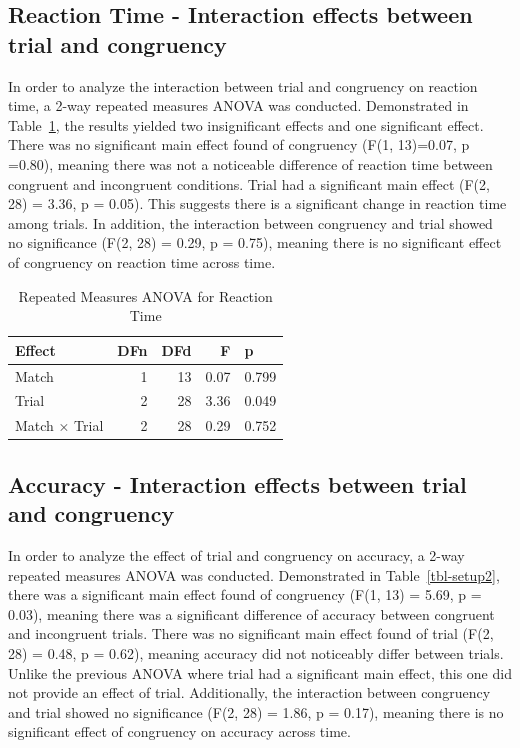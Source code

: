 \documentclass[
  authoryear,
  preprint]{elsarticle}
\begin{document}
\subsection{Reaction Time - Interaction effects between trial and
congruency}\label{reaction-time---interaction-effects-between-trial-and-congruency}

In order to analyze the interaction between trial and congruency on
reaction time, a 2-way repeated measures ANOVA was conducted.
Demonstrated in Table~\ref{tbl-setup1}, the results yielded two
insignificant effects and one significant effect. There was no
significant main effect found of congruency (F(1, 13)=0.07, p =0.80),
meaning there was not a noticeable difference of reaction time between
congruent and incongruent conditions. Trial had a significant main
effect (F(2, 28) = 3.36, p = 0.05). This suggests there is a significant
change in reaction time among trials. In addition, the interaction
between congruency and trial showed no significance (F(2, 28) = 0.29, p
= 0.75), meaning there is no significant effect of congruency on
reaction time across time.

\begin{longtable}[]{@{}lrrrl@{}}

\caption{\label{tbl-setup1}Repeated Measures ANOVA for Reaction Time}

\tabularnewline

\toprule\noalign{}
Effect & DFn & DFd & F & p \\
\midrule\noalign{}
\endhead
\bottomrule\noalign{}
\endlastfoot
Match & 1 & 13 & 0.07 & 0.799 \\
Trial & 2 & 28 & 3.36 & 0.049 \\
Match × Trial & 2 & 28 & 0.29 & 0.752 \\

\end{longtable}

\subsection{Accuracy - Interaction effects between trial and
congruency}\label{accuracy---interaction-effects-between-trial-and-congruency}

In order to analyze the effect of trial and congruency on accuracy, a
2-way repeated measures ANOVA was conducted. Demonstrated in
Table~\ref{tbl-setup2}, there was a significant main effect found of
congruency (F(1, 13) = 5.69, p = 0.03), meaning there was a significant
difference of accuracy between congruent and incongruent trials. There
was no significant main effect found of trial (F(2, 28) = 0.48, p =
0.62), meaning accuracy did not noticeably differ between trials. Unlike
the previous ANOVA where trial had a significant main effect, this one
did not provide an effect of trial. Additionally, the interaction
between congruency and trial showed no significance (F(2, 28) = 1.86, p
= 0.17), meaning there is no significant effect of congruency on
accuracy across time.
\end{document}
